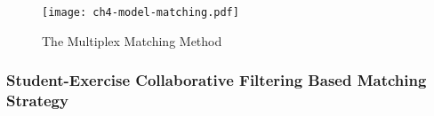 \begin{figure}[h]
  \centering
  \texttt{[image: ch4-model-matching.pdf]}
  \caption{The Multiplex Matching Method}\label{fig:ch4-matching}
\end{figure}

\subsubsection{Student-Exercise Collaborative Filtering Based Matching Strategy}




